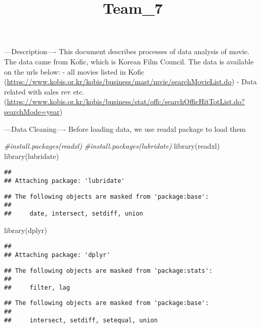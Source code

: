 \documentclass[
]{article}
\title{Team\_7}
\author{}
\date{\vspace{-2.5em}}
\newenvironment{Shaded}{\begin{snugshade}}{\end{snugshade}}
\newcommand{\CommentTok}[1]{\textcolor[rgb]{0.56,0.35,0.01}{\textit{#1}}}
\newcommand{\FunctionTok}[1]{\textcolor[rgb]{0.00,0.00,0.00}{#1}}
\newcommand{\NormalTok}[1]{#1}
\begin{document}
\maketitle

---Description---- This document describes processes of data analysis of
movie. The data came from Kofic, which is Korean Film Council. The data
is available on the urls below: - all movies listed in Kofic
(\url{https://www.kobis.or.kr/kobis/business/mast/mvie/searchMovieList.do})
- Data related with sales rev etc.
(\url{https://www.kobis.or.kr/kobis/business/stat/offc/searchOfficHitTotList.do?searchMode=year})

---Data Cleaning---- Before loading data, we use readxl package to load
them

\begin{Shaded}
\begin{Highlighting}[]
\CommentTok{\#install.packages(\textquotesingle{}readxl\textquotesingle{})}
\CommentTok{\#install.packages(\textquotesingle{}lubridate\textquotesingle{})}
\FunctionTok{library}\NormalTok{(readxl)}
\FunctionTok{library}\NormalTok{(lubridate)}
\end{Highlighting}
\end{Shaded}

\begin{verbatim}
## 
## Attaching package: 'lubridate'
\end{verbatim}

\begin{verbatim}
## The following objects are masked from 'package:base':
## 
##     date, intersect, setdiff, union
\end{verbatim}

\begin{Shaded}
\begin{Highlighting}[]
\FunctionTok{library}\NormalTok{(dplyr)}
\end{Highlighting}
\end{Shaded}

\begin{verbatim}
## 
## Attaching package: 'dplyr'
\end{verbatim}

\begin{verbatim}
## The following objects are masked from 'package:stats':
## 
##     filter, lag
\end{verbatim}

\begin{verbatim}
## The following objects are masked from 'package:base':
## 
##     intersect, setdiff, setequal, union
\end{verbatim}
\end{document}
